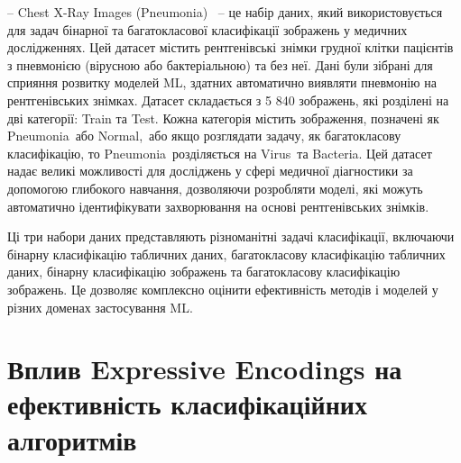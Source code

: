 -- Chest X-Ray Images (Pneumonia)~\cite{ct32} -- це набір даних, який використовується для задач бінарної та багатокласової класифікації зображень у медичних дослідженнях. Цей датасет містить рентгенівські знімки грудної клітки пацієнтів з пневмонією (вірусною або бактеріальною) та без неї. Дані були зібрані для сприяння розвитку моделей ML, здатних автоматично виявляти пневмонію на рентгенівських знімках. Датасет складається з 5 840 зображень, які розділені на дві категорії: Train та Test. Кожна категорія містить зображення, позначені як \glqq Pneumonia\grqq\ або \glqq Normal,\grqq\ або якщо розглядати задачу, як багатокласову класифікацію, то \glqq Pneumonia\grqq\ розділяється на \glqq Virus\grqq\ та \glqq Bacteria\grqq. Цей датасет надає великі можливості для досліджень у сфері медичної діагностики за допомогою глибокого навчання, дозволяючи розробляти моделі, які можуть автоматично ідентифікувати захворювання на основі рентгенівських знімків.

Ці три набори даних представляють різноманітні задачі класифікації, включаючи бінарну класифікацію табличних даних, багатокласову класифікацію табличних даних, бінарну класифікацію зображень та багатокласову класифікацію зображень. Це дозволяє комплексно оцінити ефективність методів і моделей у різних доменах застосування ML.

\section{Вплив Expressive Encodings на ефективність класифікаційних алгоритмів}

